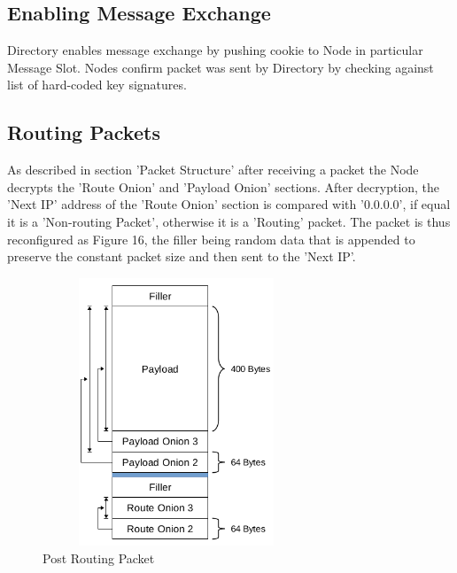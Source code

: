\documentclass{article}
\begin{document}
\subsection{Enabling Message Exchange}
Directory enables message exchange by pushing cookie to Node in particular Message Slot. Nodes confirm packet was sent by Directory by checking against list of hard-coded key signatures.
\subsection{Routing Packets}
As described in section 'Packet Structure' after receiving a packet the Node decrypts the 'Route Onion' and 'Payload Onion' sections. After decryption, the 'Next IP' address of the 'Route Onion' section is compared with '0.0.0.0',
if equal it is a 'Non-routing Packet', otherwise it is a 'Routing' packet. The packet is thus reconfigured as Figure 16, the filler being random data that is appended to preserve the constant packet size and then sent to the 'Next IP'.
\begin{figure}[h]
	\centering
  	\includegraphics[width=8cm,height=8cm,keepaspectratio]{img/BasicPacketStructurePostRoute.png}
	\caption{Post Routing Packet}
\end{figure}
\newpage
\end{document}

